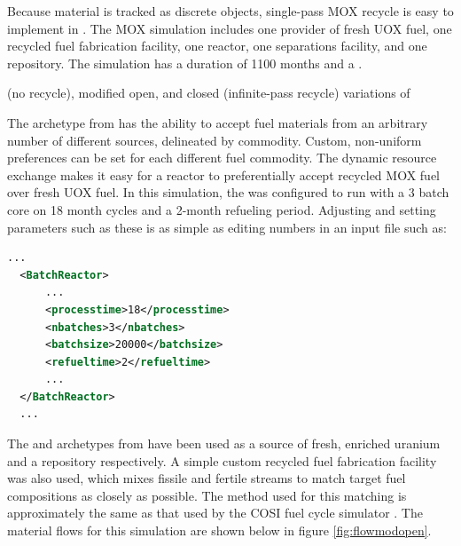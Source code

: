 Because material is tracked as discrete objects, single-pass \gls{MOX} 
recycle is easy to implement in \Cyclus.  The MOX simulation includes one provider of fresh
\gls{UOX} fuel, one recycled fuel fabrication facility, one reactor, one separations
facility, and one repository. The simulation has a duration of 1100 months and a .

(no recycle), modified open, and closed (infinite-pass recycle) variations of

The  archetype from \Cycamore has the ability to accept
fuel materials from an arbitrary number of different sources, delineated by
commodity. Custom, non-uniform preferences can be set for each different fuel
commodity.  The dynamic resource exchange makes it easy for a reactor to
preferentially accept recycled \gls{MOX} fuel over fresh \gls{UOX} fuel.  In this
simulation, the
 was configured to run with a 3 batch core on 18 month cycles and
a 2-month refueling period.  Adjusting and setting parameters such as these is
as simple as editing numbers in an input file such as:

\begin{lstlisting}[language=xml]
  ...
  <BatchReactor>
      ...
      <processtime>18</processtime>
      <nbatches>3</nbatches>
      <batchsize>20000</batchsize>
      <refueltime>2</refueltime>
      ...
  </BatchReactor>
  ...
\end{lstlisting}

The  and  archetypes from \Cycamore have been used as a
source of fresh, enriched uranium and a repository respectively. A simple
custom recycled fuel fabrication facility was also used, which mixes fissile 
and fertile streams to match target fuel compositions as closely
as possible.  The method used for this matching is approximately the same as
that used by the \gls{COSI} fuel cycle simulator . The material flows for this simulation are shown below in figure
\ref{fig:flowmodopen}.

